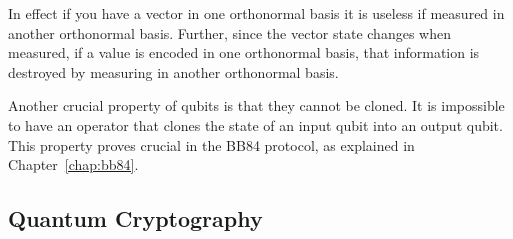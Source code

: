 In effect if you have a vector in one orthonormal basis it is useless if measured in another orthonormal basis.
Further, since the vector state changes when measured, if a value is encoded in one orthonormal basis, that information is destroyed by measuring in another orthonormal basis. 

Another crucial property of qubits is that they cannot be cloned.
It is impossible to have an operator that clones the state of an input qubit into an output qubit.
This property proves crucial in the BB84 protocol, as explained in Chapter~\ref{chap:bb84}.

\subsection{Quantum Cryptography}

